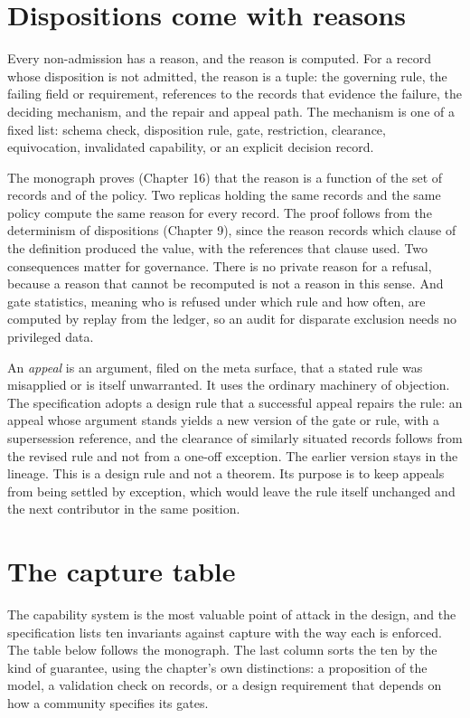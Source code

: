 \documentclass[11pt]{article}
\begin{document}
\section{Dispositions come with reasons}\label{sec:reasons}

Every non-admission has a reason, and the reason is computed. For a record whose disposition is not admitted, the reason is a tuple: the governing rule, the failing field or requirement, references to the records that evidence the failure, the deciding mechanism, and the repair and appeal path. The mechanism is one of a fixed list: schema check, disposition rule, gate, restriction, clearance, equivocation, invalidated capability, or an explicit decision record.

The monograph proves (Chapter 16) that the reason is a function of the set of records and of the policy. Two replicas holding the same records and the same policy compute the same reason for every record. The proof follows from the determinism of dispositions (Chapter 9), since the reason records which clause of the definition produced the value, with the references that clause used. Two consequences matter for governance. There is no private reason for a refusal, because a reason that cannot be recomputed is not a reason in this sense. And gate statistics, meaning who is refused under which rule and how often, are computed by replay from the ledger, so an audit for disparate exclusion needs no privileged data.

An \emph{appeal} is an argument, filed on the meta surface, that a stated rule was misapplied or is itself unwarranted. It uses the ordinary machinery of objection. The specification adopts a design rule that a successful appeal repairs the rule: an appeal whose argument stands yields a new version of the gate or rule, with a supersession reference, and the clearance of similarly situated records follows from the revised rule and not from a one-off exception. The earlier version stays in the lineage. This is a design rule and not a theorem. Its purpose is to keep appeals from being settled by exception, which would leave the rule itself unchanged and the next contributor in the same position.

\section{The capture table}\label{sec:capture}

The capability system is the most valuable point of attack in the design, and the specification lists ten invariants against capture with the way each is enforced. The table below follows the monograph. The last column sorts the ten by the kind of guarantee, using the chapter's own distinctions: a proposition of the model, a validation check on records, or a design requirement that depends on how a community specifies its gates.
\end{document}

